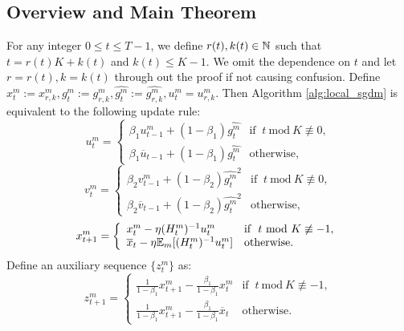 \documentclass{article} %
\numberwithin{equation}{section}
\begin{document}
\subsection{Overview and Main Theorem}
    For any integer $0\leq t\leq T-1$, we define $r(t),k(t)\in\mathbb{N}$ such that $t=r(t)K+k(t)$ and $k(t)\leq K-1$. We omit the dependence on $t$ and let $r=r(t),k=k(t)$ through out the proof if not causing confusion. Define $x_t^m:=x_{r,k}^m, g_t^m:=g_{r,k}^m, \widehat{g_t^m}:=\widehat{g_{r,k}^m}, u_t^m=u_{r,k}^m$. Then Algorithm \ref{alg:local_sgdm} is equivalent to the following update rule:
    \begin{equation}
        u_t^m = \left\{
        \begin{array}{ll}
            \beta_1u_{t-1}^m + (1-\beta_1)\widehat{g_t^m} & \text{if $\ t\ \text{mod}\ K \not\equiv 0$}, \\
            \beta_1\overline{u}_{t-1} + (1-\beta_1)\widehat{g_t^m} & \text{otherwise}, 
        \end{array}
        \right.
    \end{equation}
    \begin{equation}
        v_t^m = \left\{
        \begin{array}{ll}
            \beta_2v_{t-1}^m + (1-\beta_2)\widehat{g_t^m}^2 & \text{if $\ t\ \text{mod}\ K \not\equiv 0$}, \\
            \beta_2\overline{v}_{t-1} + (1-\beta_2)\widehat{g_t^m}^2 & \text{otherwise}, 
        \end{array}
        \right.
    \end{equation}
    \begin{equation}
        x_{t+1}^m = \left\{
        \begin{array}{ll}
            x_t^m-\eta (H_t^m)^{-1}u_t^m & \text{if $\ t\ \text{mod}\ K \not\equiv -1$}, \\
            \overline{x}_t-\eta \expect_m[(H_t^m)^{-1}u_t^m] & \text{otherwise}.
        \end{array}
        \right.
    \end{equation}
    Define an auxiliary sequence $\{z_t^m\}$ as:
    \begin{equation}
        z_{t+1}^m = \left\{
        \begin{array}{ll}
            \frac{1}{1-\beta_1}x_{t+1}^m-\frac{\beta_1}{1-\beta_1}x_t^m & \text{if $\ t\ \text{mod}\ K \not\equiv -1$}, \\
            \frac{1}{1-\beta_1}x_{t+1}^m-\frac{\beta_1}{1-\beta_1}\overline{x}_t & \text{otherwise}.
        \end{array}
        \right.
    \end{equation}
\end{document}
